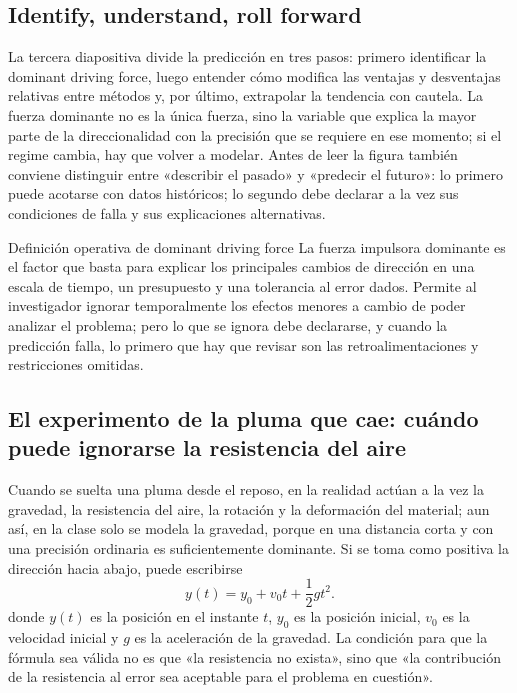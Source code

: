\subsection{Identify, understand, roll forward}

La tercera diapositiva divide la predicción en tres pasos: primero identificar la dominant driving force, luego entender cómo modifica las ventajas y desventajas relativas entre métodos y, por último, extrapolar la tendencia con cautela. La fuerza dominante no es la única fuerza, sino la variable que explica la mayor parte de la direccionalidad con la precisión que se requiere en ese momento; si el regime cambia, hay que volver a modelar. Antes de leer la figura también conviene distinguir entre «describir el pasado» y «predecir el futuro»: lo primero puede acotarse con datos históricos; lo segundo debe declarar a la vez sus condiciones de falla y sus explicaciones alternativas.


\begin{importantbox}{Definición operativa de dominant driving force}
La fuerza impulsora dominante es el factor que basta para explicar los principales cambios de dirección en una escala de tiempo, un presupuesto y una tolerancia al error dados. Permite al investigador ignorar temporalmente los efectos menores a cambio de poder analizar el problema; pero lo que se ignora debe declararse, y cuando la predicción falla, lo primero que hay que revisar son las retroalimentaciones y restricciones omitidas.
\end{importantbox}


\subsection{El experimento de la pluma que cae: cuándo puede ignorarse la resistencia del aire}

Cuando se suelta una pluma desde el reposo, en la realidad actúan a la vez la gravedad, la resistencia del aire, la rotación y la deformación del material; aun así, en la clase solo se modela la gravedad, porque en una distancia corta y con una precisión ordinaria es suficientemente dominante. Si se toma como positiva la dirección hacia abajo, puede escribirse
\[
y(t)=y_0+v_0t+\frac{1}{2}gt^2.
\]
donde $y(t)$ es la posición en el instante $t$, $y_0$ es la posición inicial, $v_0$ es la velocidad inicial y $g$ es la aceleración de la gravedad. La condición para que la fórmula sea válida no es que «la resistencia no exista», sino que «la contribución de la resistencia al error sea aceptable para el problema en cuestión».

